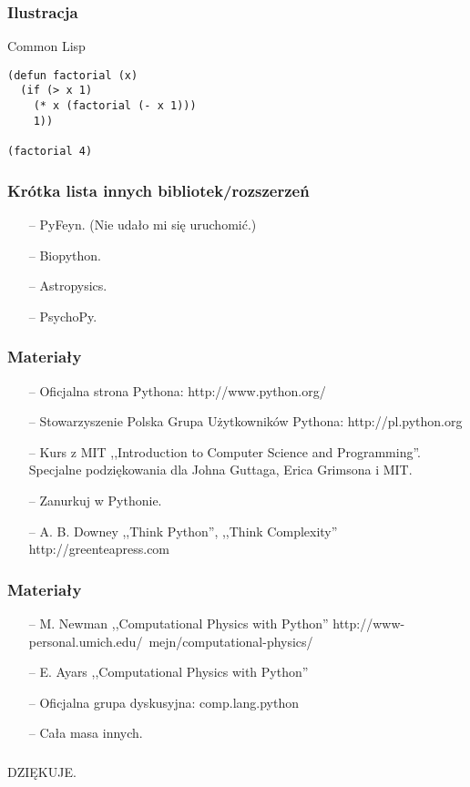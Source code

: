 \documentclass{beamer} \mode<presentation>
\begin{document}
\begin{frame}[fragile]
\frametitle{Ilustracja}

\begin{block}{Common Lisp}
\begin{verbatim}
(defun factorial (x)
  (if (> x 1)
    (* x (factorial (- x 1)))
    1))

(factorial 4)
\end{verbatim}
\end{block}

\end{frame}

\begin{frame}
\frametitle{Krótka lista innych bibliotek/rozszerzeń}

\begin{block}{}
\begin{itemize}
\item[--] PyFeyn. (Nie udało mi się uruchomić.)
\item[--] Biopython.
\item[--] Astropysics.
\item[--] PsychoPy.
\end{itemize}
\end{block}

\end{frame}

\begin{frame}
\frametitle{Materiały}

\begin{block}{}
\begin{itemize}
\item[--] Oficjalna strona Pythona: http://www.python.org/
\item[--] Stowarzyszenie Polska Grupa Użytkowników Pythona: http://pl.python.org
\item[--] Kurs z MIT ,,Introduction to Computer Science and Programming''. Specjalne podziękowania dla Johna Guttaga, Erica Grimsona i MIT.
\item[--] Zanurkuj w Pythonie.
\item[--] A. B. Downey ,,Think Python'', ,,Think Complexity'' http://greenteapress.com
\end{itemize}
\end{block}

\end{frame}

\begin{frame}
\frametitle{Materiały}

\begin{block}{}
\begin{itemize}
\item[--] M. Newman ,,Computational Physics with Python'' http://www-personal.umich.edu/~mejn/computational-physics/
\item[--] E. Ayars ,,Computational Physics with Python''
\item[--] Oficjalna grupa dyskusyjna: comp.lang.python
\item[--] Cała masa innych.
\end{itemize}
\end{block}

\end{frame}

\begin{frame}
\frametitle{}

\begin{center}
\LARGE{DZIĘKUJE.}
\end{center}

\end{frame}
\end{document}
